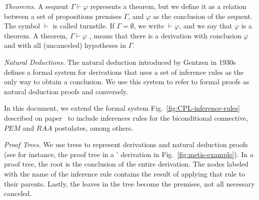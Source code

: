 \documentclass[../main.tex]{subfiles}
\begin{document}
\emph{Theorems.}
A sequent $Γ ⊢ φ$ represents a theorem, but we
define it as a relation between a set of propositions premises $Γ$,
and $φ$ as the conclusion of the sequent.
The symbol $⊢$ is called turnstile.
If $Γ = ∅$, we write $⊢ φ$, and we say that $φ$ is a theorem.
A theorem, $Γ ⊢ φ$ , means that there is a derivation with
conclusion $φ$ and with all (uncanceled) hypotheses in $Γ$.




\emph{Natural Deductions.}
The natural deduction introduced by Gentzen in 1930s defines a formal system
for derivations that uses a set of inference rules as the only way to obtain a
conclusion. We use this system to refer to formal proofs as natural deduction
proofs and conversely.

In this document, we extend the \CPL formal system
Fig.~\ref{fig:CPL-inference-rules} described on
paper~\cite{Altenkirch2015} to include inferences rules for the biconditional
connective, $PEM$ and $RAA$ postulates, among others.


\emph{Proof Trees.} We use trees to represent derivations and
natural deduction proofs (see for instance, the proof tree in a
\Metis' derivation in Fig.~\ref{fig:metis-example}).
In a proof tree, the root is the conclusion of the entire
derivation. The nodes labeled with the name of the inference rule
contains the result of applying that rule to their parents. Lastly,
the leaves in the tree become the premises, not all necessary
canceled.
\end{document}
